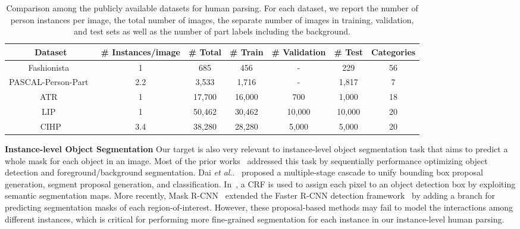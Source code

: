 \documentclass[runningheads]{llncs}
\makeatletter
\DeclareRobustCommand\onedot{\futurelet\@let@token\@onedot}
\def\@onedot{\ifx\@let@token.\else.\null\fi\xspace}
\def\etal{\emph{et al}\onedot}
\makeatother
\begin{document}
\begin{table}[t]
\centering
\scriptsize
\caption{Comparison among the publicly available datasets for human parsing. For each dataset, we report the number of person instances per image, the total number of images, the separate number of images in training, validation, and test sets as well as the number of part labels including the background.}
\tabcolsep 0.02in 
\begin{tabular}{ccccccc}
\toprule[0.7pt]
    Dataset                                  & \# Instances/image  & \# Total & \# Train  & \# Validation & \# Test   & Categories \\ \hline 
    Fashionista~\cite{yamaguchi2012parsing}  &     1               & 685      &  456      &         -      &    229    & 56         \\
    PASCAL-Person-Part~\cite{chen2014detect} &     2.2             & 3,533    &  1,716    &         -      &    1,817  & 7          \\
    ATR~\cite{Co-CNN}                        &     1               & 17,700   &  16,000   &        700     &    1,000  & 18         \\ 
    LIP~\cite{Gong_2017_CVPR}                &     1               & 50,462   &  30,462   &        10,000  &    10,000 & 20         \\ \hline
    CIHP                                     &     3.4             & 38,280   &  28,280   &        5,000   &    5,000  & 20         \\ 
\toprule[0.7pt]
\end{tabular}
\vspace{-8mm}
\label{tab:dataset_num}
\end{table}


\textbf{Instance-level Object Segmentation}    
Our target is also very relevant to instance-level object segmentation task that aims to predict a whole mask for each object in an image. Most of the prior works~\cite{Dai_2016_CVPR,pinheiro2015learning,hariharan2014simultaneous,liang2016reversible,pinheiro2015learning,He_2017_ICCV} addressed this task by sequentially performance optimizing object detection and foreground/background segmentation. Dai \etal~\cite{Dai_2016_CVPR} proposed a multiple-stage cascade to unify bounding box proposal generation, segment proposal generation, and classification. In~\cite{Arnab_2017_CVPR,li2017holistic}, a CRF is used to assign each pixel to an object detection box by exploiting semantic segmentation maps. More recently, Mask R-CNN~\cite{He_2017_ICCV} extended the Faster R-CNN detection framework~\cite{fasterrcnn} by adding a branch for predicting segmentation masks of each region-of-interest. However, these proposal-based methods may fail to model the interactions among different instances, which is critical for performing more fine-grained segmentation for each instance in our instance-level human parsing.
\end{document}
